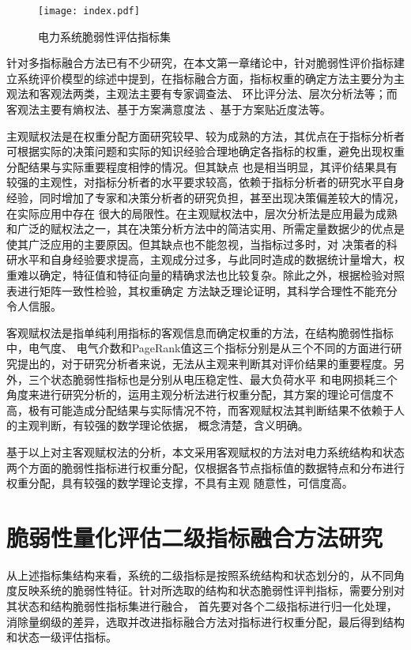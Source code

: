 \begin{figure}[H] %
    \centering
    \texttt{[image: index.pdf]}
    \caption{电力系统脆弱性评估指标集}
    \label{fig:index}
  \end{figure}

针对多指标融合方法已有不少研究，在本文第一章绪论中，针对脆弱性评价指标建立系统评价模型的综述中提到，在指标融合方面，指标权重的确定方法主要分为主观法和客观法两类，主观法主要有专家调查法、
环比评分法、层次分析法等；而客观法主要有熵权法、基于方案满意度法 、基于方案贴近度法等。

主观赋权法是在权重分配方面研究较早、较为成熟的方法，其优点在于指标分析者可根据实际的决策问题和实际的知识经验合理地确定各指标的权重，避免出现权重分配结果与实际重要程度相悖的情况。但其缺点
也是相当明显，其评价结果具有较强的主观性，对指标分析者的水平要求较高，依赖于指标分析者的研究水平自身经验，同时增加了专家和决策分析者的研究负担，甚至出现决策偏差较大的情况，在实际应用中存在
很大的局限性。在主观赋权法中，层次分析法是应用最为成熟和广泛的赋权法之一，其在决策分析方法中的简洁实用、所需定量数据少的优点是使其广泛应用的主要原因。但其缺点也不能忽视，当指标过多时，对
决策者的科研水平和自身经验要求提高，主观成分过多，与此同时造成的数据统计量增大，权重难以确定，特征值和特征向量的精确求法也比较复杂。除此之外，根据检验对照表进行矩阵一致性检验，其权重确定
方法缺乏理论证明，其科学合理性不能充分令人信服。


客观赋权法是指单纯利用指标的客观信息而确定权重的方法，在结构脆弱性指标中，电气度、
电气介数和PageRank值这三个指标分别是从三个不同的方面进行研究提出的，对于研究分析者来说，无法从主观来判断其对评价结果的重要程度。另外，三个状态脆弱性指标也是分别从电压稳定性、最大负荷水平
和电网损耗三个角度来进行研究分析的，运用主观分析法进行权重分配，其方案的理论可信度不高，极有可能造成分配结果与实际情况不符，而客观赋权法其判断结果不依赖于人的主观判断，有较强的数学理论依据，
概念清楚，含义明确。

基于以上对主客观赋权法的分析，本文采用客观赋权的方法对电力系统结构和状态两个方面的脆弱性指标进行权重分配，仅根据各节点指标值的数据特点和分布进行权重分配，具有较强的数学理论支撑，不具有主观
随意性，可信度高。


\section{脆弱性量化评估二级指标融合方法研究}
\label{sec:processIndex}
从上述指标集结构来看，系统的二级指标是按照系统结构和状态划分的，从不同角度反映系统的脆弱性特征。针对所选取的结构和状态脆弱性评判指标，需要分别对其状态和结构脆弱性指标集进行融合，
首先要对各个二级指标进行归一化处理，消除量纲级的差异，选取并改进指标融合方法对指标进行权重分配，最后得到结构和状态一级评估指标。


